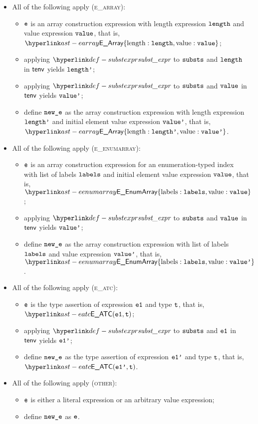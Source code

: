 \begin{itemize}
  \item All of the following apply (\textsc{e\_array}):
  \begin{itemize}
    \item $\texttt{e}$ is an array construction expression with length expression $\texttt{length}$ and value expression $\texttt{value}$, that is,
          $\EArray\{\EArrayLength: \length, \EArrayValue: \vvalue\}$;
    \item applying $\substexpr$ to $\texttt{substs}$ and $\texttt{length}$ in $\textsf{tenv}$ yields $\texttt{length'}$;
    \item applying $\substexpr$ to $\texttt{substs}$ and $\texttt{value}$ in $\textsf{tenv}$ yields $\texttt{value'}$;
    \item define $\texttt{new\_e}$ as the array construction expression with length expression \\
          $\texttt{length'}$ and initial element value expression $\texttt{value'}$, that is, \\
          $\EArray\{\EArrayLength: \lengthp, \EArrayValue: \vvaluep\}$.
  \end{itemize}

  \item All of the following apply (\textsc{e\_enumarray}):
  \begin{itemize}
    \item $\texttt{e}$ is an array construction expression for an enumeration-typed index
          with list of labels $\texttt{labels}$ and initial element value expression $\texttt{value}$, that is, \\
          $\EEnumArray\{\EArrayLabels: \vlabels, \EArrayValue: \vvalue\}$;
    \item applying $\substexpr$ to $\texttt{substs}$ and $\texttt{value}$ in $\textsf{tenv}$ yields $\texttt{value'}$;
    \item define $\texttt{new\_e}$ as the array construction expression with list of labels $\texttt{labels}$
          and value expression $\texttt{value'}$, that is,
          $\EEnumArray\{\EArrayLabels: \vlabels, \EArrayValue: \vvaluep\}$.
  \end{itemize}

  \item All of the following apply (\textsc{e\_atc}):
  \begin{itemize}
    \item $\texttt{e}$ is the type assertion of expression $\texttt{e1}$ and type $\texttt{t}$, that is, $\EATC(\veone, \vt)$;
    \item applying $\substexpr$ to $\texttt{substs}$ and $\texttt{e1}$ in $\textsf{tenv}$ yields $\texttt{e1'}$;
    \item define $\texttt{new\_e}$ as the type assertion of expression $\texttt{e1'}$ and type $\texttt{t}$, that is, $\EATC(\veonep, \vt)$.
  \end{itemize}

  \item All of the following apply (\textsc{other}):
  \begin{itemize}
    \item $\texttt{e}$ is either a literal expression or an arbitrary value expression;
    \item define $\texttt{new\_e}$ as $\texttt{e}$.
  \end{itemize}
\end{itemize}

